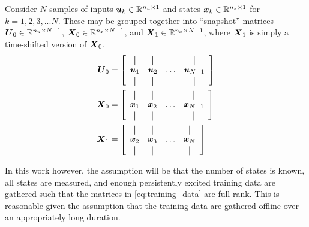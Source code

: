 Consider $N$ samples of inputs $\vb*{u}_{k} \in \mathbb{R}^{n_{u} \times 1}$ and states $\vb*{x}_{k} \in \mathbb{R}^{n_{x} \times 1}$ for $k = 1, 2, 3, ... N$.  These may be grouped together into ``snapshot'' matrices $\vb*{U}_{0} \in \mathbb{R}^{n_{u} \times N-1}$, $\vb*{X}_{0} \in \mathbb{R}^{n_{x} \times N-1}$, and $\vb*{X}_{1} \in \mathbb{R}^{n_{x} \times N-1}$, where $\vb*{X}_{1}$ is simply a time-shifted version of $\vb*{X}_{0}$.
\begin{equation}
\label{eq:training_data}
\begin{aligned}
	\vb*{U}_{0} &= \left[
	  \begin{array}{cccc}
	    \vertbar & \vertbar & & \vertbar \\
	    \vb*{u}_{1} & \vb*{u}_{2} & \ldots & \vb*{u}_{N-1}\\
	    \vertbar & \vertbar & & \vertbar 
	  \end{array}
	  \right]\\
	\vb*{X}_{0} &= \left[
	  \begin{array}{cccc}
	    \vertbar & \vertbar & & \vertbar \\
	    \vb*{x}_{1} & \vb*{x}_{2} & \ldots & \vb*{x}_{N-1}\\
	    \vertbar & \vertbar & & \vertbar 
	  \end{array}
	  \right]\\
	\vb*{X}_{1} &= \left[
	  \begin{array}{cccc}
	    \vertbar & \vertbar & & \vertbar \\
	    \vb*{x}_{2} & \vb*{x}_{3} & \ldots & \vb*{x}_{N}\\
	    \vertbar & \vertbar & & \vertbar 
	  \end{array}
	  \right]
\end{aligned}
\end{equation}

In this work however, the assumption will be that the number of states is known, all states are measured, and enough persistently excited training data are gathered such that the matrices in \eqref{eq:training_data} are full-rank.  This is reasonable given the assumption that the training data are gathered offline over an appropriately long duration.

